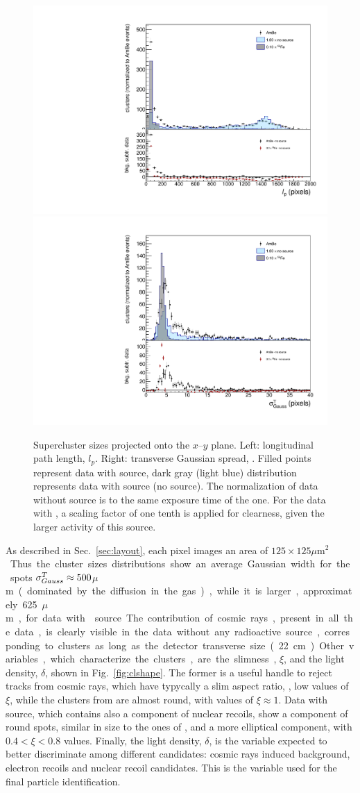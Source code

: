 \begin{figure}[ht]
  \begin{center}
  \includegraphics[width=0.45\linewidth]{figures/length}
  \includegraphics[width=0.45\linewidth]{figures/tgausssigma}

  \caption{Supercluster sizes projected onto the $x$--$y$ plane. Left:
    longitudinal path length, $l_p$.  Right: transverse Gaussian
    spread, \tsigmag. Filled points represent data with \ambe source,
    dark gray (light blue) distribution represents data with \fe
    source (no source).  The normalization of data without source is
    to the same exposure time of the \ambe one. For the data with \fe,
    a scaling factor of one tenth is applied for clearness, given the
    larger activity of this source.  \label{fig:clsize}}

    \end{center}
\end{figure}

As described in Sec.~\ref{sec:layout}, each pixel images an area of
$125\times125$\unit{$\mu$m$^2$}. Thus the cluster sizes distributions
show an average Gaussian width for the \fe spots
$\sigma^T_{Gauss}\approx500$\unit{$\mu$m} (dominated by the diffusion in the
gas), while it is larger, approximately 625\unit{$\mu$m}, for data
with \ambe source.  The contribution of cosmic rays, present in all
the data, is clearly visible in the data without any radioactive
source, corresponding to clusters as long as the detector transverse
size (22\unit{cm}).

Other variables, which characterize the clusters, are the slimness,
$\xi$, and the light density, $\delta$, shown in
Fig.~\ref{fig:clshape}. The former is a useful handle to reject tracks
from cosmic rays, which have typycally a slim aspect ratio, \ie, low
values of $\xi$, while the clusters from \fe are almost round, with
values of $\xi\approx1$. Data with \ambe source, which contains also a
component of nuclear recoils, show a component of round spots,
similar in size to the ones of \fe, and a more elliptical component,
with $0.4<\xi<0.8$ values. Finally, the light density, $\delta$, is the
variable expected to better discriminate among different
candidates: cosmic rays induced background, electron recoils and
nuclear recoil candidates. This is the variable used for the final
particle identification.

